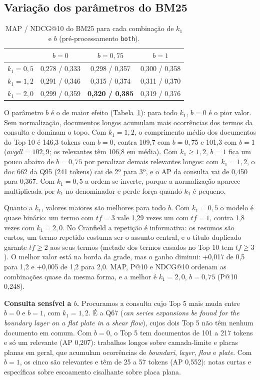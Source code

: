 \documentclass[10pt,a4paper]{article}
\newcommand{\term}[1]{\textit{#1}}      %
\begin{document}
\subsection{Variação dos parâmetros do BM25}

\begin{table}[!htb]
  \centering\small
  \caption{MAP / NDCG@10 do BM25 para cada combinação de $k_1$ e $b$ (pré-processamento \texttt{both}).}
  \label{tab:param}
  \begin{tabular}{lccc}
    \toprule
                & $b=0$ & $b=0{,}75$ & $b=1$\\
    \midrule
    $k_1=0{,}5$ & 0,278 / 0,333 & 0,298 / 0,357 & 0,300 / 0,358\\
    $k_1=1{,}2$ & 0,291 / 0,346 & 0,315 / 0,374 & 0,311 / 0,370\\
    $k_1=2{,}0$ & 0,299 / 0,359 & \textbf{0,320 / 0,385} & 0,319 / 0,376\\
    \bottomrule
  \end{tabular}
\end{table}

O parâmetro $b$ é o de maior efeito (Tabela~\ref{tab:param}): para todo $k_1$, $b=0$ é o pior valor. Sem normalização, documentos longos acumulam mais ocorrências dos termos da consulta e dominam o topo. Com $k_1=1{,}2$, o comprimento médio dos documentos do Top 10 é 146,3 tokens com $b=0$, contra 109,7 com $b=0{,}75$ e 101,3 com $b=1$ ($avgdl=102{,}9$; os relevantes têm 106,8 em média). Com $k_1\geq1{,}2$, $b=1$ fica um pouco abaixo de $b=0{,}75$ por penalizar demais relevantes longos: com $k_1=1{,}2$, o doc 662 da Q95 (241 tokens) cai de 2º para 3º, e o AP da consulta vai de 0,450 para 0,367. Com $k_1=0{,}5$ a ordem se inverte, porque a normalização aparece multiplicada por $k_1$ no denominador e perde força quando $k_1$ é pequeno.

Quanto a $k_1$, valores maiores são melhores para todo $b$. Com $k_1=0{,}5$ o modelo é quase binário: um termo com $tf=3$ vale 1,29 vezes um com $tf=1$, contra 1,8 vezes com $k_1=2{,}0$. No Cranfield a repetição é informativa: os resumos são curtos, um termo repetido costuma ser o assunto central, e o título duplicado garante $tf\geq2$ aos seus termos (metade dos termos casados no Top 10 tem $tf\geq3$). O melhor valor está na borda da grade, mas o ganho diminui: +0,017 de 0,5 para 1,2 e +0,005 de 1,2 para 2,0. MAP, P@10 e NDCG@10 ordenam as combinações quase da mesma forma, e a melhor é $k_1=2{,}0$, $b=0{,}75$ (P@10 0,248).

\textbf{Consulta sensível a $b$.} Procuramos a consulta cujo Top 5 mais muda entre $b=0$ e $b=1$, com $k_1=1{,}2$. É a Q67 (\term{can series expansions be found for the boundary layer on a flat plate in a shear flow}), cujos dois Top 5 não têm nenhum documento em comum. Com $b=0$, o Top 5 tem documentos de 101 a 217 tokens e só um relevante (AP 0,207): trabalhos longos sobre camada-limite e placas planas em geral, que acumulam ocorrências de \term{boundari}, \term{layer}, \term{flow} e \term{plate}. Com $b=1$, os cinco são relevantes e têm de 25 a 57 tokens (AP 0,552): notas curtas e específicas sobre escoamento cisalhante sobre placa plana.
\end{document}
